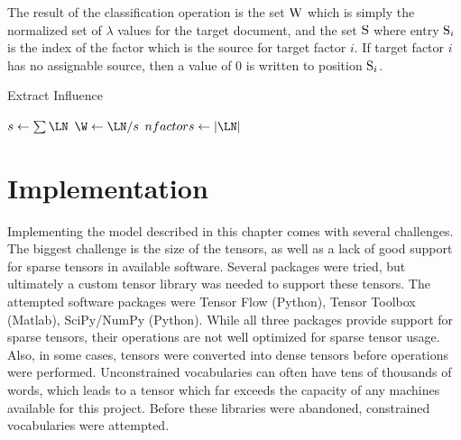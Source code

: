 \documentclass[../ut-dissertation.tex]{subfiles}
\begin{document}
The result of the classification operation is the set $\mathrm{W}$ which
is simply the normalized set of $\lambda$ values for the target
document, and the set $\mathrm{S}$ where entry $\mathrm{S}_i$ is the index
of the factor which is the source for target factor $i$.  If target
factor $i$ has no assignable source, then a value of 0 is written to
position $\mathrm{S}_i$.
\begin{algorithm}
  \caption{Extract Influence}
  \label{alg:influence}
   
   
  
  \Output{\W, \S}
  \BlankLine
  $s \leftarrow \sum \LN$\;
  $\W \leftarrow \LN / s$\;
  \BlankLine
  $nfactors \leftarrow |\LN|$\;
  \Return{\W, \S}\;
\end{algorithm}

\section{Implementation}
Implementing the model described in this chapter comes with several
challenges.  The biggest challenge is the size of the tensors, as well
as a lack of good support for sparse tensors in available software.
Several packages were tried, but ultimately a custom tensor library
was needed to support these tensors.  The attempted software packages
were Tensor Flow (Python), Tensor Toolbox (Matlab),  SciPy/NumPy
(Python).  While all three packages provide support for sparse
tensors, their operations are not well optimized for sparse tensor
usage.  Also, in some cases, tensors were converted into dense tensors
before operations were performed.  Unconstrained vocabularies can
often have tens of thousands of words, which leads to a tensor which
far exceeds the capacity of any machines available for this project.
Before these libraries were abandoned, constrained vocabularies were
attempted.
\end{document}
